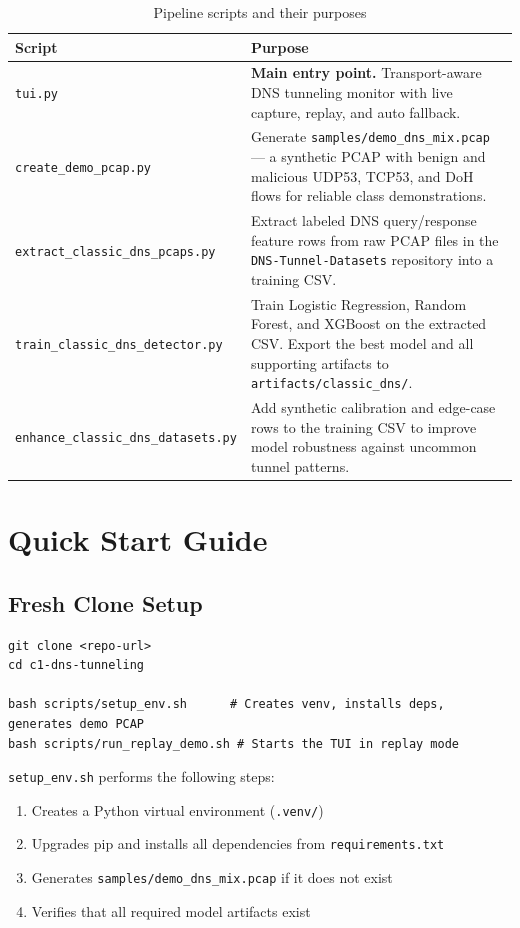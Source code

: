 \documentclass[12pt,a4paper]{article}
\begin{document}
\begin{table}[H]
\centering
\begin{tabular}{@{}lp{9cm}@{}}
\toprule
\textbf{Script} & \textbf{Purpose} \\
\midrule
\texttt{tui.py} & \textbf{Main entry point.} Transport-aware DNS tunneling monitor with live capture, replay, and auto fallback. \\
\texttt{create\_demo\_pcap.py} & Generate \texttt{samples/demo\_dns\_mix.pcap} --- a synthetic PCAP with benign and malicious UDP53, TCP53, and DoH flows for reliable class demonstrations. \\
\texttt{extract\_classic\_dns\_pcaps.py} & Extract labeled DNS query/response feature rows from raw PCAP files in the \texttt{DNS-Tunnel-Datasets} repository into a training CSV. \\
\texttt{train\_classic\_dns\_detector.py} & Train Logistic Regression, Random Forest, and XGBoost on the extracted CSV. Export the best model and all supporting artifacts to \texttt{artifacts/classic\_dns/}. \\
\texttt{enhance\_classic\_dns\_datasets.py} & Add synthetic calibration and edge-case rows to the training CSV to improve model robustness against uncommon tunnel patterns. \\
\bottomrule
\end{tabular}
\caption{Pipeline scripts and their purposes}
\end{table}

\section{Quick Start Guide}

\subsection{Fresh Clone Setup}

\begin{lstlisting}
git clone <repo-url>
cd c1-dns-tunneling

bash scripts/setup_env.sh      # Creates venv, installs deps, generates demo PCAP
bash scripts/run_replay_demo.sh # Starts the TUI in replay mode
\end{lstlisting}

\texttt{setup\_env.sh} performs the following steps:
\begin{enumerate}
    \item Creates a Python virtual environment (\texttt{.venv/})
    \item Upgrades pip and installs all dependencies from \texttt{requirements.txt}
    \item Generates \texttt{samples/demo\_dns\_mix.pcap} if it does not exist
    \item Verifies that all required model artifacts exist
\end{enumerate}
\end{document}
